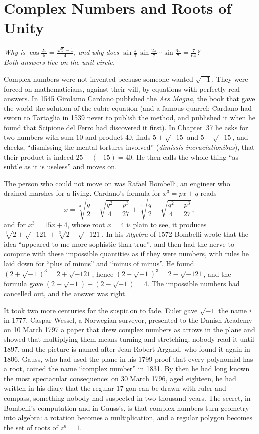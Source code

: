 \chapter{Complex Numbers and Roots of Unity}

\begin{center}\itshape
Why is $\cos\frac{2\pi}5=\frac{\sqrt5-1}4$, and why does $\sin\frac\pi7\,\sin\frac{2\pi}7\cdots\sin\frac{6\pi}7=\frac7{64}$?\\
Both answers live on the unit circle.
\end{center}

Complex numbers were not invented because someone wanted $\sqrt{-1}$. They were forced on mathematicians, against their will, by equations
with perfectly real answers. In 1545 Girolamo Cardano published the \emph{Ars Magna}, the book that gave the world the solution of the cubic
equation (and a famous quarrel: Cardano had sworn to Tartaglia in 1539 never to publish the method, and published it when he found that Scipione
del Ferro had discovered it first). In Chapter~37 he asks for two numbers with sum $10$ and product $40$, finds $5+\sqrt{-15}$ and $5-\sqrt{-15}$,
and checks, ``dismissing the mental tortures involved'' (\emph{dimissis incruciationibus}), that their product is indeed $25-(-15)=40$. He then calls
the whole thing ``as subtle as it is useless'' and moves on.

The person who could not move on was Rafael Bombelli, an engineer who drained marshes for a living. Cardano's formula for $x^3=px+q$ reads
\[
x=\sqrt[3]{\frac q2+\sqrt{\frac{q^2}4-\frac{p^3}{27}}}+\sqrt[3]{\frac q2-\sqrt{\frac{q^2}4-\frac{p^3}{27}}},
\]
and for $x^3=15x+4$, whose root $x=4$ is plain to see, it produces $\sqrt[3]{2+\sqrt{-121}}+\sqrt[3]{2-\sqrt{-121}}$. In his \emph{Algebra} of 1572
Bombelli wrote that the idea ``appeared to me more sophistic than true'', and then had the nerve to compute with these impossible quantities as if
they were numbers, with rules he laid down for ``plus of minus'' and ``minus of minus''. He found $(2+\sqrt{-1})^3=2+\sqrt{-121}$, hence
$(2-\sqrt{-1})^3=2-\sqrt{-121}$, and the formula gave $(2+\sqrt{-1})+(2-\sqrt{-1})=4$. The impossible numbers had cancelled out, and the answer was right.

It took two more centuries for the suspicion to fade. Euler gave $\sqrt{-1}$ the name $i$ in 1777. Caspar Wessel, a Norwegian surveyor, presented to
the Danish Academy on 10 March 1797 a paper that drew complex numbers as arrows in the plane and showed that multiplying them means turning and
stretching; nobody read it until 1897, and the picture is named after Jean-Robert Argand, who found it again in 1806. Gauss, who had used the plane
in his 1799 proof that every polynomial has a root, coined the name ``complex number'' in 1831. By then he had long known the most spectacular
consequence: on 30 March 1796, aged eighteen, he had written in his diary that the regular $17$-gon can be drawn with ruler and compass,
something nobody had suspected in two thousand years. The secret, in Bombelli's computation and in Gauss's, is that complex numbers turn geometry
into algebra: a rotation becomes a multiplication, and a regular polygon becomes the set of roots of $z^n=1$.

